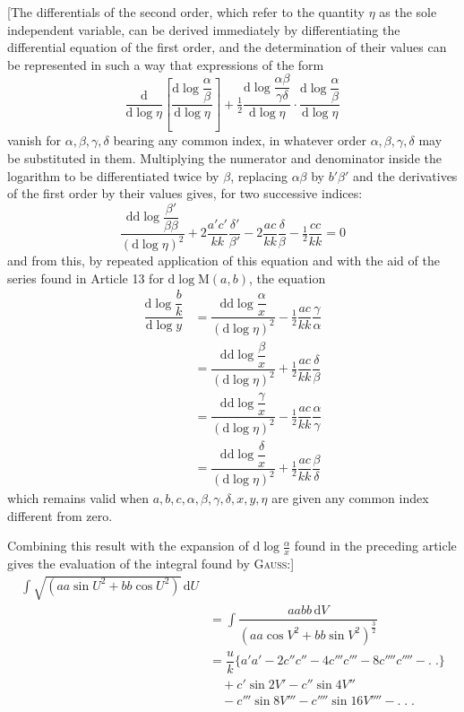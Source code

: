 [The differentials of the second order, which refer to the quantity $\eta$ as the sole independent variable, can be derived immediately by differentiating the differential equation of the first order, and the determination of their values can be represented in such a way that expressions of the form
\[
\dfrac{\mathrm{d}}{\mathrm{d}\log\eta}
\left[\dfrac{\mathrm{d}\log\dfrac{\alpha}{\beta}}{\mathrm{d}\log\eta}\right]
+\tfrac12\dfrac{\mathrm{d}\log\dfrac{\alpha\beta}{\gamma\delta}}{\mathrm{d}\log\eta}
\cdot\dfrac{\mathrm{d}\log\dfrac{\alpha}{\beta}}{\mathrm{d}\log\eta}
\]
vanish for $\alpha,\allowbreak \beta,\allowbreak \gamma,\allowbreak \delta$ bearing any common index, in whatever order $\alpha,\allowbreak \beta,\allowbreak \gamma,\allowbreak \delta$ may be substituted in them. Multiplying the numerator and denominator inside the logarithm to be differentiated twice by $\beta$, replacing $\alpha\beta$ by $b'\beta'$ and the derivatives of the first order by their values gives, for two successive indices:
\[
\dfrac{\mathrm{dd}\log\dfrac{\beta'}{\beta\beta}}{(\mathrm{d}\log\eta)^2}
+2\dfrac{a'c'}{kk}\dfrac{\delta'}{\beta'}
-2\dfrac{ac}{kk}\dfrac{\delta}{\beta}-\tfrac12\dfrac{cc}{kk}=0
\]
and from this, by repeated application of this equation and with the aid of the series found in Article 13 for $\mathrm{d}\log\mathrm{M}(a,\allowbreak b)$, the equation
\[
\begin{aligned}\dfrac{\mathrm{d}\log\dfrac{b}{k}}{\mathrm{d}\log y}
&=\dfrac{\mathrm{dd}\log\dfrac{\alpha}{x}}{(\mathrm{d}\log\eta)^2}-\tfrac12\dfrac{ac}{kk}\dfrac{\gamma}{\alpha}
\\[7pt]&=\dfrac{\mathrm{dd}\log\dfrac{\beta}{x}}{(\mathrm{d}\log\eta)^2}+\tfrac12\dfrac{ac}{kk}\dfrac{\delta}{\beta}
\\[7pt]&=\dfrac{\mathrm{dd}\log\dfrac{\gamma}{x}}{(\mathrm{d}\log\eta)^2}-\tfrac12\dfrac{ac}{kk}\dfrac{\alpha}{\gamma}
\\[7pt]&=\dfrac{\mathrm{dd}\log\dfrac{\delta}{x}}{(\mathrm{d}\log\eta)^2}+\tfrac12\dfrac{ac}{kk}\dfrac{\beta}{\delta}\end{aligned}
\]
which remains valid when $a,\allowbreak b,\allowbreak c,\allowbreak \alpha,\allowbreak \beta,\allowbreak \gamma,\allowbreak \delta,\allowbreak x,\allowbreak y,\allowbreak \eta$ are given any common index different from zero.

Combining this result with the expansion of $\mathrm{d}\log\frac{\alpha}{x}$ found in the preceding article gives the evaluation of the integral found by \textsc{Gauss}:]
\[
\begin{aligned}
\int\surd{(aa\sin U^2+bb\cos U^2)}\,\mathrm{d}U
\\[7pt]&=\int\dfrac{aabb\,\mathrm{d}V}{(aa\cos V^2+bb\sin V^2)^{\frac32}}\\
&=\dfrac{u}{k}\{a'a'-2c''c''-4c'''c'''-8c''''c''''-.\;.\}\\
&\quad+c'\sin 2V'-c''\sin 4V''\\&\quad-c'''\sin 8V'''-c''''\sin 16V''''-.\;.\;.\end{aligned}
\]

\clearpage
\endgroup
